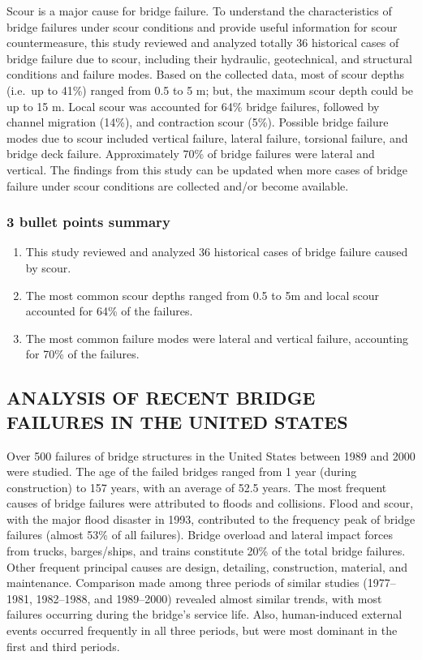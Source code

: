 \documentclass[
  letterpaper,
  DIV=11,
  numbers=noendperiod]{scrreprt}
\providecommand{\tightlist}{%
  \setlength{\itemsep}{0pt}\setlength{\parskip}{0pt}}\usepackage{longtable,booktabs,array}
\begin{document}
Scour is a major cause for bridge failure. To understand the
characteristics of bridge failures under scour conditions and provide
useful information for scour countermeasure, this study reviewed and
analyzed totally 36 historical cases of bridge failure due to scour,
including their hydraulic, geotechnical, and structural conditions and
failure modes. Based on the collected data, most of scour depths
(i.e.~up to 41\%) ranged from 0.5 to 5 m; but, the maximum scour depth
could be up to 15 m. Local scour was accounted for 64\% bridge failures,
followed by channel migration (14\%), and contraction scour (5\%).
Possible bridge failure modes due to scour included vertical failure,
lateral failure, torsional failure, and bridge deck failure.
Approximately 70\% of bridge failures were lateral and vertical. The
findings from this study can be updated when more cases of bridge
failure under scour conditions are collected and/or become available.

\hypertarget{bullet-points-summary-20}{%
\subsubsection{3 bullet points summary}\label{bullet-points-summary-20}}

\begin{enumerate}
\def\labelenumi{\arabic{enumi}.}
\tightlist
\item
  This study reviewed and analyzed 36 historical cases of bridge failure
  caused by scour.
\item
  The most common scour depths ranged from 0.5 to 5m and local scour
  accounted for 64\% of the failures.
\item
  The most common failure modes were lateral and vertical failure,
  accounting for 70\% of the failures.
\end{enumerate}

\hypertarget{analysis-of-recent-bridge-failures-in-the-united-states}{%
\subsection{ANALYSIS OF RECENT BRIDGE FAILURES IN THE UNITED
STATES}\label{analysis-of-recent-bridge-failures-in-the-united-states}}

Over 500 failures of bridge structures in the United States between 1989
and 2000 were studied. The age of the failed bridges ranged from 1 year
(during construction) to 157 years, with an average of 52.5 years. The
most frequent causes of bridge failures were attributed to floods and
collisions. Flood and scour, with the major flood disaster in 1993,
contributed to the frequency peak of bridge failures (almost 53\% of all
failures). Bridge overload and lateral impact forces from trucks,
barges/ships, and trains constitute 20\% of the total bridge failures.
Other frequent principal causes are design, detailing, construction,
material, and maintenance. Comparison made among three periods of
similar studies (1977--1981, 1982--1988, and 1989--2000) revealed almost
similar trends, with most failures occurring during the bridge's service
life. Also, human-induced external events occurred frequently in all
three periods, but were most dominant in the first and third periods.
\end{document}
